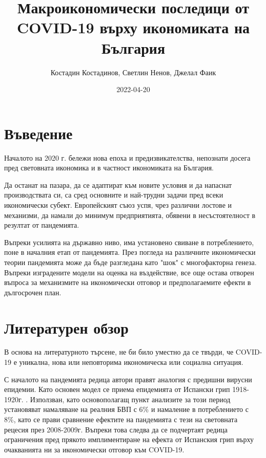 \documentclass[a4paper,12pt]{article}
\title{Макроикономически последици от COVID-19 върху икономиката на България}
\date{2022-04-20}
\author{Костадин Костадинов, Светлин Ненов, Джелал Фаик}
\begin{document}
\maketitle

\section{Въведение}
Началото на 2020 г. бележи нова епоха и предизвикателства, непознати досега пред световната икономика и в частност икономиката на България.

Да останат на пазара, да се адаптират към новите условия и да напаснат производствата си, са сред основните и най-трудни задачи пред всеки икономически субект. Европейският съюз успя, чрез различни лостове и механизми, да намали до минимум предприятията, обявени в несъстоятелност в резултат от пандемията. 

Въпреки усилията на държавно ниво, има установено свиване в потреблението, поне в началния етап от пандемията. През погледа на различните икономически теории пандемията може да бъде разгледана като "шок" с многофакторна генеза. Въпреки изградените модели на оценка на въздействие, все още остава отворен въпроса за механизмите на икономически отговор и предполагаемите ефекти в дългосрочен план.

\section{Литературен обзор}

В основа на литературното търсене, не би било уместно да се твърди, че COVID-19 е уникална, нова или неповторима икономическа или социална ситуация\cite{https://doi.org/10.1111/joes.12423}. 

С началото на пандемията редица автори правят аналогия с предишни вирусни епидемии. Като основен модел се приема епидемията от Испански грип 1918-1920г. \cite{barro_coronavirus_2020}. Използван, като основополагащ пункт анализите за този период установяват намаляване на реалния БВП с 6\% и намаление в потреблението с 8\%, като се прави сравнение ефектите на пандемията с тези на световната рецесия през 2008-2009г. Въпреки това следва да се подчертаят редица ограничения пред прякото имплиментиране на ефекта от Испанския грип върху очакванията ни за икономически отговор към COVID-19\cite{eichenbaum_epidemics_2020-1}. 
\end{document}
